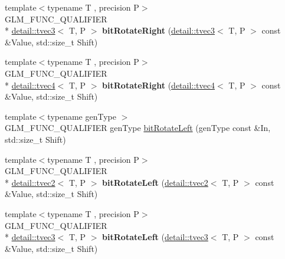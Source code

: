 \begin{DoxyCompactItemize}
\item 
\hypertarget{namespaceglm_acd2e2cfc11667479cf8c279667cfb162}{{\footnotesize template$<$typename T , precision P$>$ }\\G\-L\-M\-\_\-\-F\-U\-N\-C\-\_\-\-Q\-U\-A\-L\-I\-F\-I\-E\-R \\*
\hyperlink{structglm_1_1detail_1_1tvec3}{detail\-::tvec3}$<$ T, P $>$ {\bfseries bit\-Rotate\-Right} (\hyperlink{structglm_1_1detail_1_1tvec3}{detail\-::tvec3}$<$ T, P $>$ const \&Value, std\-::size\-\_\-t Shift)}\label{namespaceglm_acd2e2cfc11667479cf8c279667cfb162}

\item 
\hypertarget{namespaceglm_a06a3b8df080a9a4b7dd1148134ade32a}{{\footnotesize template$<$typename T , precision P$>$ }\\G\-L\-M\-\_\-\-F\-U\-N\-C\-\_\-\-Q\-U\-A\-L\-I\-F\-I\-E\-R \\*
\hyperlink{structglm_1_1detail_1_1tvec4}{detail\-::tvec4}$<$ T, P $>$ {\bfseries bit\-Rotate\-Right} (\hyperlink{structglm_1_1detail_1_1tvec4}{detail\-::tvec4}$<$ T, P $>$ const \&Value, std\-::size\-\_\-t Shift)}\label{namespaceglm_a06a3b8df080a9a4b7dd1148134ade32a}

\item 
{\footnotesize template$<$typename gen\-Type $>$ }\\G\-L\-M\-\_\-\-F\-U\-N\-C\-\_\-\-Q\-U\-A\-L\-I\-F\-I\-E\-R gen\-Type \hyperlink{group__gtx__bit_ga32c0a5149152a9aa75afafe81b19be53}{bit\-Rotate\-Left} (gen\-Type const \&In, std\-::size\-\_\-t Shift)
\item 
\hypertarget{namespaceglm_a1f2d95e740a8909b8b5d760722f04954}{{\footnotesize template$<$typename T , precision P$>$ }\\G\-L\-M\-\_\-\-F\-U\-N\-C\-\_\-\-Q\-U\-A\-L\-I\-F\-I\-E\-R \\*
\hyperlink{structglm_1_1detail_1_1tvec2}{detail\-::tvec2}$<$ T, P $>$ {\bfseries bit\-Rotate\-Left} (\hyperlink{structglm_1_1detail_1_1tvec2}{detail\-::tvec2}$<$ T, P $>$ const \&Value, std\-::size\-\_\-t Shift)}\label{namespaceglm_a1f2d95e740a8909b8b5d760722f04954}

\item 
\hypertarget{namespaceglm_afd830a73912ea4ec771a5d9bd09c3cd4}{{\footnotesize template$<$typename T , precision P$>$ }\\G\-L\-M\-\_\-\-F\-U\-N\-C\-\_\-\-Q\-U\-A\-L\-I\-F\-I\-E\-R \\*
\hyperlink{structglm_1_1detail_1_1tvec3}{detail\-::tvec3}$<$ T, P $>$ {\bfseries bit\-Rotate\-Left} (\hyperlink{structglm_1_1detail_1_1tvec3}{detail\-::tvec3}$<$ T, P $>$ const \&Value, std\-::size\-\_\-t Shift)}\label{namespaceglm_afd830a73912ea4ec771a5d9bd09c3cd4}


\end{DoxyCompactItemize}
